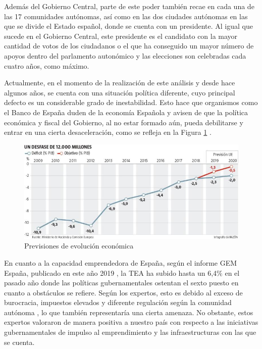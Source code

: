 \clearpage

Además del Gobierno Central, parte de este poder también recae en cada una de las 17 comunidades autónomas, así como en las dos ciudades autónomas en las que se divide el Estado español, donde se cuenta con un presidente. Al igual que sucede en el Gobierno Central, este presidente es el candidato con la mayor cantidad de votos de los ciudadanos o el que ha conseguido un mayor número de apoyos dentro del parlamento autonómico y las elecciones son celebradas cada cuatro años, como máximo.

Actualmente, en el momento de la realización de este análisis y desde hace algunos años, se cuenta con una situación política diferente, cuyo principal defecto es un considerable grado de inestabilidad. Esto hace que organismos como el Banco de España duden de la economía Española y avisen de que la política económica y fiscal del Gobierno, al no estar formado aún, pueda debilitarse y entrar en una cierta desaceleración, como se refleja en la Figura \ref{fig:evolrazon} \cite{larazon2019}.

\begin{figure}[h]
  \centering
  \includegraphics[width=0.9\linewidth]{figures/images/evolucion_larazon.jpg}
  \caption{Previsiones de evolución económica}
  \label{fig:evolrazon}
\end{figure}

En cuanto a la capacidad emprendedora de España, según el informe \acf{GEM} España, publicado en este año 2019 \cite{informegem2019}, la \acf{TEA} ha subido hasta un 6,4\% en el pasado año donde las políticas gubernamentales ostentan el sexto puesto en cuanto a obstáculos se refiere. Según los expertos, esto es debido al exceso de burocracia, impuestos elevados y diferente regulación según la comunidad autónoma \cite{yolandagonzalez2019}, lo que también representaría una cierta amenaza. No obstante, estos expertos valoraron de manera positiva a nuestro país con respecto a las iniciativas gubernamentales de impulso al emprendimiento y las infraestructuras con las que se cuenta.

